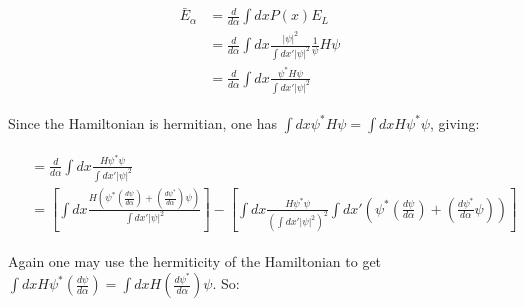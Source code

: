 \documentclass[english, a4paper]{article}
\begin{document}
\begin{align}
\begin{split}
\bar{E}_\alpha &= \frac{d}{d\alpha}\int dx P(x) E_L\\
&= \frac{d}{d\alpha}\int dx \frac{|\psi|^2}{\int dx'|\psi|^2}\frac{1}{\psi}H\psi\\
&= \frac{d}{d\alpha}\int dx \frac{\psi^*H\psi}{\int dx'|\psi|^2}
\end{split}
\end{align}

Since the Hamiltonian is hermitian, one has $\int dx\psi^* H \psi = \int dx H\psi^*\psi$, giving:

\begin{align}
\begin{split}
&= \frac{d}{d\alpha}\int dx \frac{H\psi^*\psi}{\int dx'|\psi|^2}\\
&= \left[ \int dx\frac{H\left(\psi^*\left(\frac{d\psi}{d\alpha}\right) + \left(\frac{d\psi^*}{d\alpha}\right)\psi\right)}{\int dx'|\psi|^2} \right] - \left[ \int dx \frac{H\psi^*\psi}{\left(\int dx'|\psi|^2\right)^2}\int dx'\left( \psi^*\left(\frac{d\psi}{d\alpha}\right) + \left(\frac{d\psi^*}{d\alpha}\psi\right) \right) \right]
\end{split}
\end{align}

Again one may use the hermiticity of the Hamiltonian to get $\int dx H \psi^*\left(\frac{d\psi}{d\alpha}\right) = \int dx H \left(\frac{d\psi^*}{d\alpha}\right)\psi$. So:
\end{document}

